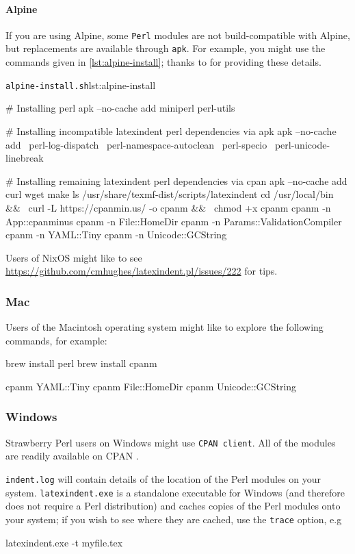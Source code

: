 		\paragraph{Alpine}
			If you are using Alpine, some \texttt{Perl} modules are not build-compatible with Alpine,
			but replacements are available through \texttt{apk}. For example, you might use the
			commands given in \cref{lst:alpine-install}; thanks to \cite{jun-sheaf} for providing
			these details.

			\begin{cmhlistings}[style=tcblatex,language=Bash]{\texttt{alpine-install.sh}}{lst:alpine-install}
		
# Installing perl
apk --no-cache add miniperl perl-utils

# Installing incompatible latexindent perl dependencies via apk
apk --no-cache add \
    perl-log-dispatch \
    perl-namespace-autoclean \
    perl-specio \
    perl-unicode-linebreak

# Installing remaining latexindent perl dependencies via cpan
apk --no-cache add curl wget make
ls /usr/share/texmf-dist/scripts/latexindent
cd /usr/local/bin && \
    curl -L https://cpanmin.us/ -o cpanm && \
    chmod +x cpanm
cpanm -n App::cpanminus
cpanm -n File::HomeDir
cpanm -n Params::ValidationCompiler
cpanm -n YAML::Tiny
cpanm -n Unicode::GCString
\end{cmhlistings}

			Users of NixOS might like to see
			\href{https://github.com/cmhughes/latexindent.pl/issues/222}{https://github.com/cmhughes/latexindent.pl/issues/222}
			for tips.
	\subsubsection{Mac}
		Users of the Macintosh operating system might like to explore the following commands, for
		example:
		\begin{commandshell}
brew install perl
brew install cpanm

cpanm YAML::Tiny
cpanm File::HomeDir
cpanm Unicode::GCString
\end{commandshell}

	\subsubsection{Windows}
		Strawberry Perl users on Windows might use \texttt{CPAN client}. All of the modules are
		readily available on CPAN \cite{cpan}.

		\texttt{indent.log} will contain details of the location
		of the Perl modules on your system. \texttt{latexindent.exe} is a standalone executable
		for Windows (and therefore does not require a Perl distribution) and caches copies of the
		Perl modules onto your system; if you wish to see where they are cached, use the
		\texttt{trace} option, e.g
		\begin{dosprompt}
latexindent.exe -t myfile.tex
 \end{dosprompt}

